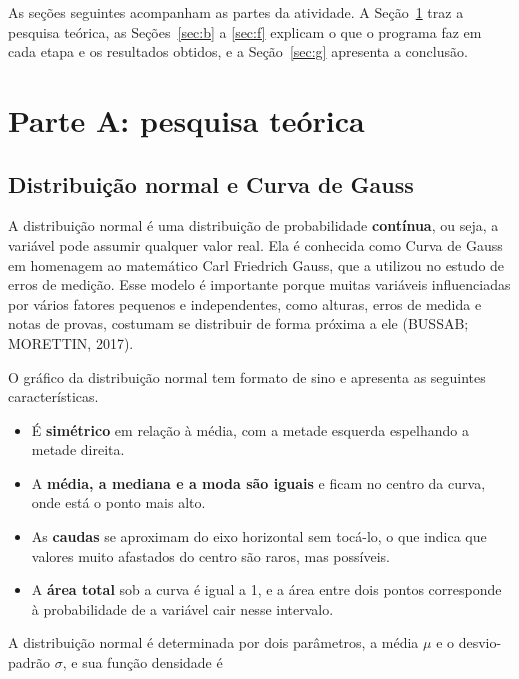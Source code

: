 \documentclass[12pt,a4paper]{article}
\begin{document}
As seções seguintes acompanham as partes da atividade. A Seção~\ref{sec:a} traz a pesquisa teórica, as Seções~\ref{sec:b} a \ref{sec:f} explicam o que o programa faz em cada etapa e os resultados obtidos, e a Seção~\ref{sec:g} apresenta a conclusão.

\section{Parte A: pesquisa teórica}\label{sec:a}

\subsection{Distribuição normal e Curva de Gauss}

A distribuição normal é uma distribuição de probabilidade \textbf{contínua}, ou seja, a variável pode assumir qualquer valor real. Ela é conhecida como Curva de Gauss em homenagem ao matemático Carl Friedrich Gauss, que a utilizou no estudo de erros de medição. Esse modelo é importante porque muitas variáveis influenciadas por vários fatores pequenos e independentes, como alturas, erros de medida e notas de provas, costumam se distribuir de forma próxima a ele (BUSSAB; MORETTIN, 2017).

O gráfico da distribuição normal tem formato de sino e apresenta as seguintes características.

\begin{itemize}[leftmargin=*]
  \item É \textbf{simétrico} em relação à média, com a metade esquerda espelhando a metade direita.
  \item A \textbf{média, a mediana e a moda são iguais} e ficam no centro da curva, onde está o ponto mais alto.
  \item As \textbf{caudas} se aproximam do eixo horizontal sem tocá-lo, o que indica que valores muito afastados do centro são raros, mas possíveis.
  \item A \textbf{área total} sob a curva é igual a 1, e a área entre dois pontos corresponde à probabilidade de a variável cair nesse intervalo.
\end{itemize}

A distribuição normal é determinada por dois parâmetros, a média $\mu$ e o desvio-padrão $\sigma$, e sua função densidade é
\end{document}
